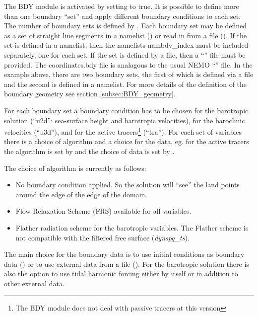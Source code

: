 \documentclass[../tex_main/NEMO_manual]{subfiles}
\begin{document}
The BDY module is activated by setting  to true.
It is possible to define more than one boundary ``set'' and apply
different boundary conditions to each set. The number of boundary
sets is defined by .  Each boundary set may be defined
as a set of straight line segments in a namelist
() or read in from a file
(). If the set is defined in a namelist,
then the namelists nambdy\_index must be included separately, one for
each set. If the set is defined by a file, then a
``'' file must be provided. The coordinates.bdy file
is analagous to the usual NEMO ``'' file. In the example
above, there are two boundary sets, the first of which is defined via
a file and the second is defined in a namelist. For more details of
the definition of the boundary geometry see section
\autoref{subsec:BDY_geometry}.

For each boundary set a boundary
condition has to be chosen for the barotropic solution (``u2d'':
sea-surface height and barotropic velocities), for the baroclinic
velocities (``u3d''), and for the active tracers\footnote{The BDY
  module does not deal with passive tracers at this version}
(``tra''). For each set of variables there is a choice of algorithm
and a choice for the data, eg. for the active tracers the algorithm is
set by  and the choice of data is set by
. 

The choice of algorithm is currently as follows:

\mbox{}

\begin{itemize}
\item[0.] No boundary condition applied. So the solution will ``see''
  the land points around the edge of the edge of the domain.
\item[1.] Flow Relaxation Scheme (FRS) available for all variables. 
\item[2.] Flather radiation scheme for the barotropic variables. The
  Flather scheme is not compatible with the filtered free surface
  ({\it dynspg\_ts}). 
\end{itemize}

\mbox{}

The main choice for the boundary data is
to use initial conditions as boundary data () or to
use external data from a file (). For the
barotropic solution there is also the option to use tidal
harmonic forcing either by itself or in addition to other external
data. 
\end{document}
